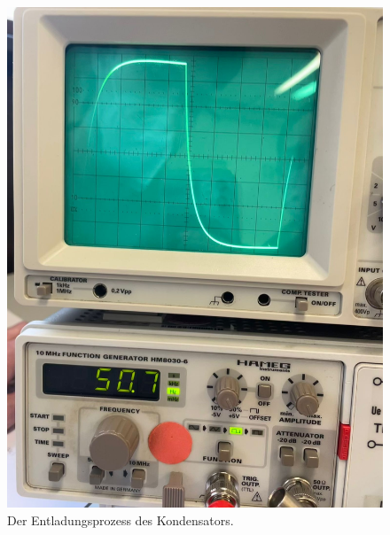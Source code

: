 \begin{figure}
  \centering
  \includegraphics[scale=0.1]{content/entladung.png}
  \caption{Der Entladungsprozess des Kondensators.}
  \label{abb:Entladung}
\end{figure}


